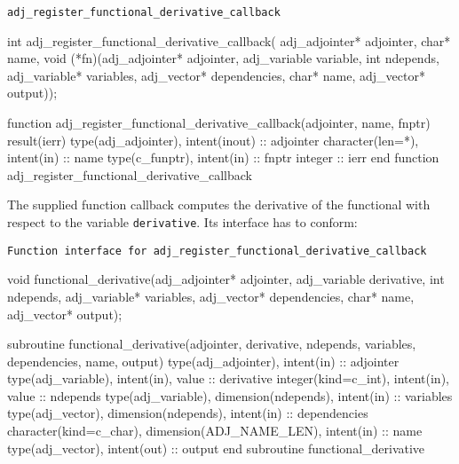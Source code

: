 
\begin{boxwithtitle}{\texttt{adj_register_functional_derivative_callback}}
\begin{minipage}{\columnwidth}
\begin{ccode}
int adj_register_functional_derivative_callback(
                    adj_adjointer* adjointer, char* name, 
                    void (*fn)(adj_adjointer* adjointer, 
                               adj_variable variable, int ndepends, 
                               adj_variable* variables, adj_vector* dependencies, 
                               char* name, adj_vector* output));
\end{ccode}
\begin{fortrancode}
function adj_register_functional_derivative_callback(adjointer, name, fnptr) 
                                                                      result(ierr)
  type(adj_adjointer), intent(inout) :: adjointer
  character(len=*), intent(in) :: name
  type(c_funptr), intent(in) :: fnptr
  integer :: ierr
end function adj_register_functional_derivative_callback
\end{fortrancode}
\end{minipage}
\end{boxwithtitle}

The supplied function callback computes the derivative of the functional with respect to the variable \texttt{derivative}. 
Its interface has to conform:

\begin{boxwithtitle}{\texttt{Function interface for \texttt{adj_register_functional_derivative_callback}}}
\begin{minipage}{\columnwidth}
\begin{ccode}
void functional_derivative(adj_adjointer* adjointer,
                               adj_variable derivative, int ndepends, 
                               adj_variable* variables, adj_vector* dependencies,
                               char* name, adj_vector* output);
\end{ccode}
\begin{fortrancode}
subroutine functional_derivative(adjointer, derivative, ndepends, variables, 
                                 dependencies, name, output) 
  type(adj_adjointer), intent(in) :: adjointer
  type(adj_variable), intent(in), value :: derivative 
  integer(kind=c_int), intent(in), value :: ndepends
  type(adj_variable), dimension(ndepends), intent(in) :: variables
  type(adj_vector), dimension(ndepends), intent(in) :: dependencies
  character(kind=c_char), dimension(ADJ_NAME_LEN), intent(in) :: name
  type(adj_vector), intent(out) :: output
end subroutine functional_derivative
\end{fortrancode}
\end{minipage}
\end{boxwithtitle}

